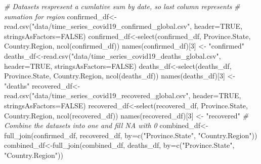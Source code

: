 \documentclass[
]{article}
\newenvironment{Shaded}{\begin{snugshade}}{\end{snugshade}}
\newcommand{\AttributeTok}[1]{\textcolor[rgb]{0.77,0.63,0.00}{#1}}
\newcommand{\CommentTok}[1]{\textcolor[rgb]{0.56,0.35,0.01}{\textit{#1}}}
\newcommand{\ConstantTok}[1]{\textcolor[rgb]{0.00,0.00,0.00}{#1}}
\newcommand{\DecValTok}[1]{\textcolor[rgb]{0.00,0.00,0.81}{#1}}
\newcommand{\FunctionTok}[1]{\textcolor[rgb]{0.00,0.00,0.00}{#1}}
\newcommand{\NormalTok}[1]{#1}
\newcommand{\OtherTok}[1]{\textcolor[rgb]{0.56,0.35,0.01}{#1}}
\newcommand{\StringTok}[1]{\textcolor[rgb]{0.31,0.60,0.02}{#1}}
\begin{document}
\begin{Shaded}
\begin{Highlighting}[]
\CommentTok{\# Datasets respresent a cumlative sum by date, so last column represents }
\CommentTok{\# sumation for region}
\NormalTok{confirmed\_df}\OtherTok{\textless{}{-}}\FunctionTok{read.csv}\NormalTok{(}\StringTok{"data/time\_series\_covid19\_confirmed\_global.csv"}\NormalTok{, }
                       \AttributeTok{header=}\ConstantTok{TRUE}\NormalTok{, }\AttributeTok{stringsAsFactors=}\ConstantTok{FALSE}\NormalTok{)}
\NormalTok{confirmed\_df}\OtherTok{\textless{}{-}}\FunctionTok{select}\NormalTok{(confirmed\_df, Province.State, }
\NormalTok{                     Country.Region, }\FunctionTok{ncol}\NormalTok{(confirmed\_df))}
\FunctionTok{names}\NormalTok{(confirmed\_df)[}\DecValTok{3}\NormalTok{] }\OtherTok{\textless{}{-}} \StringTok{"confirmed"}
\NormalTok{deaths\_df}\OtherTok{\textless{}{-}}\FunctionTok{read.csv}\NormalTok{(}\StringTok{"data/time\_series\_covid19\_deaths\_global.csv"}\NormalTok{, }
                    \AttributeTok{header=}\ConstantTok{TRUE}\NormalTok{, }\AttributeTok{stringsAsFactors=}\ConstantTok{FALSE}\NormalTok{)}
\NormalTok{deaths\_df}\OtherTok{\textless{}{-}}\FunctionTok{select}\NormalTok{(deaths\_df, Province.State, }
\NormalTok{                  Country.Region, }\FunctionTok{ncol}\NormalTok{(deaths\_df))}
\FunctionTok{names}\NormalTok{(deaths\_df)[}\DecValTok{3}\NormalTok{] }\OtherTok{\textless{}{-}} \StringTok{"deaths"}
\NormalTok{recovered\_df}\OtherTok{\textless{}{-}}\FunctionTok{read.csv}\NormalTok{(}\StringTok{"data/time\_series\_covid19\_recovered\_global.csv"}\NormalTok{, }
                       \AttributeTok{header=}\ConstantTok{TRUE}\NormalTok{, }\AttributeTok{stringsAsFactors=}\ConstantTok{FALSE}\NormalTok{)}
\NormalTok{recovered\_df}\OtherTok{\textless{}{-}}\FunctionTok{select}\NormalTok{(recovered\_df, Province.State, }
\NormalTok{                     Country.Region, }\FunctionTok{ncol}\NormalTok{(recovered\_df))}
\FunctionTok{names}\NormalTok{(recovered\_df)[}\DecValTok{3}\NormalTok{] }\OtherTok{\textless{}{-}} \StringTok{"recovered"}
\CommentTok{\# Combine the datasets into one and fill NA with 0}
\NormalTok{combined\_df}\OtherTok{\textless{}{-}}\FunctionTok{full\_join}\NormalTok{(confirmed\_df, recovered\_df, }
                       \AttributeTok{by=}\FunctionTok{c}\NormalTok{(}\StringTok{"Province.State"}\NormalTok{, }\StringTok{"Country.Region"}\NormalTok{))}
\NormalTok{combined\_df}\OtherTok{\textless{}{-}}\FunctionTok{full\_join}\NormalTok{(combined\_df, deaths\_df, }
                       \AttributeTok{by=}\FunctionTok{c}\NormalTok{(}\StringTok{"Province.State"}\NormalTok{, }\StringTok{"Country.Region"}\NormalTok{))}

\end{Highlighting}
\end{Shaded}
\end{document}
